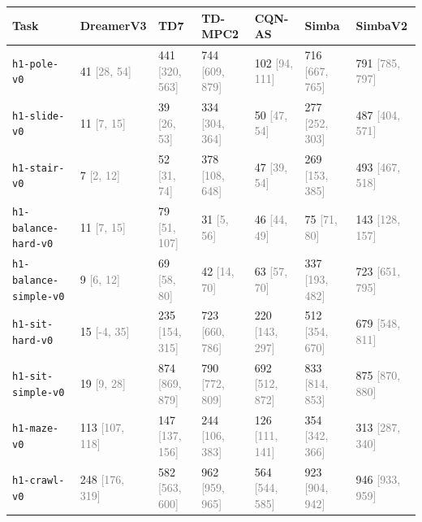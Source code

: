 \begin{tabular}{lllllll}
\toprule
\textbf{Task} & \textbf{DreamerV3} & \textbf{TD7} & \textbf{TD-MPC2} & \textbf{CQN-AS} & \textbf{Simba} & \textbf{SimbaV2} \\
\midrule
\texttt{h1-pole-v0} & 41 \textcolor{gray}{[28, 54]} & 441 \textcolor{gray}{[320, 563]} & 744 \textcolor{gray}{[609, 879]} & 102 \textcolor{gray}{[94, 111]} & 716 \textcolor{gray}{[667, 765]} & 791 \textcolor{gray}{[785, 797]} \\
\texttt{h1-slide-v0} & 11 \textcolor{gray}{[7, 15]} & 39 \textcolor{gray}{[26, 53]} & 334 \textcolor{gray}{[304, 364]} & 50 \textcolor{gray}{[47, 54]} & 277 \textcolor{gray}{[252, 303]} & 487 \textcolor{gray}{[404, 571]} \\
\texttt{h1-stair-v0} & 7 \textcolor{gray}{[2, 12]} & 52 \textcolor{gray}{[31, 74]} & 378 \textcolor{gray}{[108, 648]} & 47 \textcolor{gray}{[39, 54]} & 269 \textcolor{gray}{[153, 385]} & 493 \textcolor{gray}{[467, 518]} \\
\texttt{h1-balance-hard-v0} & 11 \textcolor{gray}{[7, 15]} & 79 \textcolor{gray}{[51, 107]} & 31 \textcolor{gray}{[5, 56]} & 46 \textcolor{gray}{[44, 49]} & 75 \textcolor{gray}{[71, 80]} & 143 \textcolor{gray}{[128, 157]} \\
\texttt{h1-balance-simple-v0} & 9 \textcolor{gray}{[6, 12]} & 69 \textcolor{gray}{[58, 80]} & 42 \textcolor{gray}{[14, 70]} & 63 \textcolor{gray}{[57, 70]} & 337 \textcolor{gray}{[193, 482]} & 723 \textcolor{gray}{[651, 795]} \\
\texttt{h1-sit-hard-v0} & 15 \textcolor{gray}{[-4, 35]} & 235 \textcolor{gray}{[154, 315]} & 723 \textcolor{gray}{[660, 786]} & 220 \textcolor{gray}{[143, 297]} & 512 \textcolor{gray}{[354, 670]} & 679 \textcolor{gray}{[548, 811]} \\
\texttt{h1-sit-simple-v0} & 19 \textcolor{gray}{[9, 28]} & 874 \textcolor{gray}{[869, 879]} & 790 \textcolor{gray}{[772, 809]} & 692 \textcolor{gray}{[512, 872]} & 833 \textcolor{gray}{[814, 853]} & 875 \textcolor{gray}{[870, 880]} \\
\texttt{h1-maze-v0} & 113 \textcolor{gray}{[107, 118]} & 147 \textcolor{gray}{[137, 156]} & 244 \textcolor{gray}{[106, 383]} & 126 \textcolor{gray}{[111, 141]} & 354 \textcolor{gray}{[342, 366]} & 313 \textcolor{gray}{[287, 340]} \\
\texttt{h1-crawl-v0} & 248 \textcolor{gray}{[176, 319]} & 582 \textcolor{gray}{[563, 600]} & 962 \textcolor{gray}{[959, 965]} & 564 \textcolor{gray}{[544, 585]} & 923 \textcolor{gray}{[904, 942]} & 946 \textcolor{gray}{[933, 959]} \\

\end{tabular}
